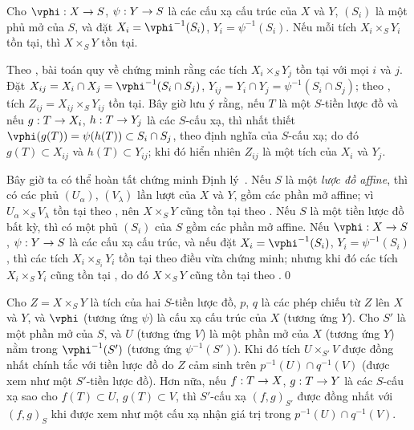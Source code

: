 \documentclass[oneside]{amsart}
\makeatletter
\newcommand{\ega@arrow}[2]{\mathchoice{#1}{#2}{#2}{#2}}
\renewcommand{\to}{\ega@arrow{\longrightarrow}{\rightarrow}}
\newcommand{\oldpage}[2][]{{\marginnote{\normalfont\textbf{#1}~|~#2}}\ignorespaces}
\let\EGAOriginalLabel\label
\renewcommand{\label}[1]{\phantomsection\EGAOriginalLabel{#1}}
\makeatother
\begin{document}
\begin{lemma}[3.2.6.4]
\label{I.3.2.6.4}
Cho $\vphi:X\to S$, $\psi:Y\to S$ là các cấu xạ cấu trúc của $X$ và
$Y$, $(S_i)$ là một phủ mở của $S$, và đặt
$X_i=\vphi^{-1}(S_i)$, $Y_i=\psi^{-1}(S_i)$. Nếu mỗi tích
$X_i\times_S Y_i$ tồn tại, thì $X\times_S Y$ tồn tại.
\end{lemma}

Theo , bài toán quy về chứng minh rằng các tích
$X_i\times_S Y_j$ tồn tại với mọi $i$ và $j$. Đặt
$X_{ij}=X_i\cap X_j=\vphi^{-1}(S_i\cap S_j)$,
$Y_{ij}=Y_i\cap Y_j=\psi^{-1}(S_i\cap S_j)$; theo
, tích $Z_{ij}=X_{ij}\times_S Y_{ij}$ tồn tại. Bây giờ
lưu ý rằng, nếu $T$ là một $S$-tiền lược đồ và nếu $g:T\to X_i$,
$h:T\to Y_j$ là các $S$-cấu xạ, thì nhất thiết
$\vphi(g(T))=\psi(h(T))\subset S_i\cap S_j$, theo định nghĩa của
$S$-cấu xạ; do đó $g(T)\subset X_{ij}$ và $h(T)\subset Y_{ij}$; khi đó
hiển nhiên $Z_{ij}$ là một tích của $X_i$ và $Y_j$.

\begin{env}[3.2.6.5]
\label{I.3.2.6.5}
Bây giờ ta có thể hoàn tất chứng minh Định lý~. Nếu $S$ là
một \emph{lược đồ affine}, thì có các phủ $(U_\alpha)$, $(V_\lambda)$ lần
lượt của $X$ và $Y$, gồm các phần mở affine; vì
$U_\alpha\times_S V_\lambda$ tồn tại theo , nên
$X\times_S Y$ cũng tồn tại theo . Nếu $S$ là một tiền lược
đồ bất kỳ, thì có một phủ $(S_i)$ của $S$ gồm các phần mở affine. Nếu
$\vphi:X\to S$, $\psi:Y\to S$ là các cấu xạ cấu trúc, và nếu đặt
$X_i=\vphi^{-1}(S_i)$, $Y_i=\psi^{-1}(S_i)$, thì các tích
$X_i\times_{S_i}Y_i$ tồn tại theo điều
\oldpage[I]{108}
vừa chứng minh; nhưng khi đó các tích $X_i\times_S Y_i$ cũng tồn tại
, do đó $X\times_S Y$ cũng tồn tại theo
.\qed
\end{env}

\begin{corollary}[3.2.7]
\label{I.3.2.7}
Cho $Z=X\times_S Y$ là tích của hai $S$-tiền lược đồ, $p$, $q$ là các phép
chiếu từ $Z$ lên $X$ và $Y$, và $\vphi$ (tương ứng $\psi$) là cấu xạ cấu
trúc của $X$ (tương ứng $Y$). Cho $S'$ là một phần mở của $S$, và $U$
(tương ứng $V$) là một phần mở của $X$ (tương ứng $Y$) nằm trong
$\vphi^{-1}(S')$ (tương ứng $\psi^{-1}(S')$). Khi đó tích
$U\times_{S'}V$ được đồng nhất chính tắc với tiền lược đồ do $Z$ cảm sinh
trên $p^{-1}(U)\cap q^{-1}(V)$ (được xem như một $S'$-tiền lược đồ). Hơn
nữa, nếu $f:T\to X$, $g:T\to Y$ là các $S$-cấu xạ sao cho
$f(T)\subset U$, $g(T)\subset V$, thì $S'$-cấu xạ $(f,g)_{S'}$ được đồng
nhất với $(f,g)_S$ khi được xem như một cấu xạ nhận giá trị trong
$p^{-1}(U)\cap q^{-1}(V)$.
\end{corollary}
\end{document}
